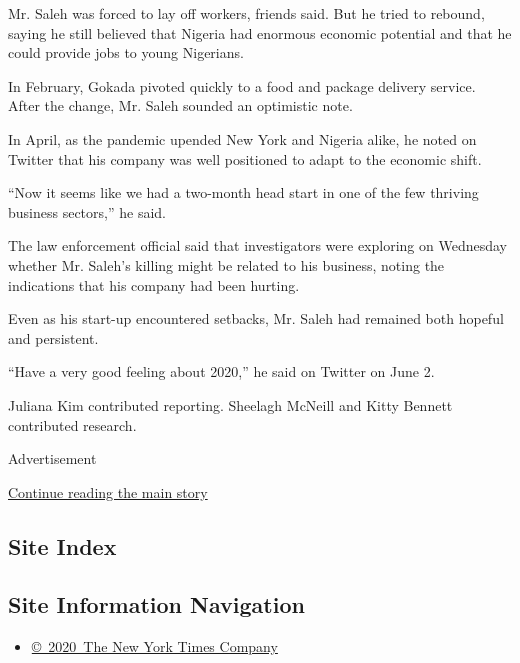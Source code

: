 Mr. Saleh was forced to lay off workers, friends said. But he tried to
rebound, saying he still believed that Nigeria had enormous economic
potential and that he could provide jobs to young Nigerians.

In February, Gokada pivoted quickly to a food and package delivery
service. After the change, Mr. Saleh sounded an optimistic note.

In April, as the pandemic upended New York and Nigeria alike, he noted
on Twitter that his company was well positioned to adapt to the economic
shift.

``Now it seems like we had a two-month head start in one of the few
thriving business sectors,'' he said.

The law enforcement official said that investigators were exploring on
Wednesday whether Mr. Saleh's killing might be related to his business,
noting the indications that his company had been hurting.

Even as his start-up encountered setbacks, Mr. Saleh had remained both
hopeful and persistent.

``Have a very good feeling about 2020,'' he said on Twitter on June 2.

Juliana Kim contributed reporting. Sheelagh McNeill and Kitty Bennett
contributed research.

Advertisement

\protect\hyperlink{after-bottom}{Continue reading the main story}

\hypertarget{site-index}{%
\subsection{Site Index}\label{site-index}}

\hypertarget{site-information-navigation}{%
\subsection{Site Information
Navigation}\label{site-information-navigation}}

\begin{itemize}
\tightlist
\item
  \href{https://help.nytimes3xbfgragh.onion/hc/en-us/articles/115014792127-Copyright-notice}{©~2020~The
  New York Times Company}
\end{itemize}

